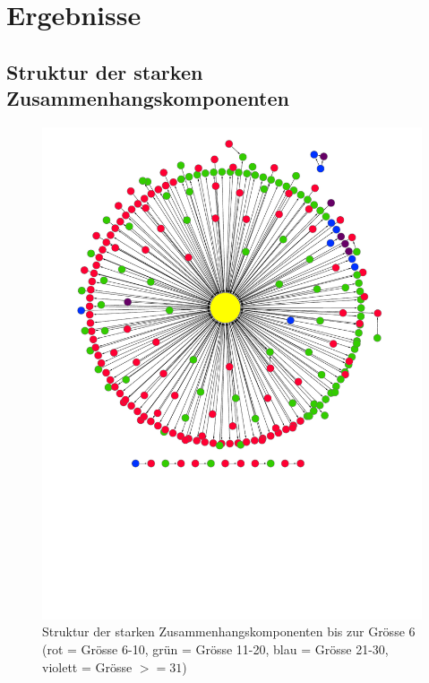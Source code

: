 
\chapter{Ergebnisse}
\label{ch:Ergebnisse}

\section{Struktur der starken Zusammenhangskomponenten}
\label{sec:struktur-der-starken}

\begin{figure}[h]
  \centering
  \includegraphics[scale=0.9]{images/metagraph-8.pdf}
  \caption{Struktur der starken Zusammenhangskomponenten bis zur
    Grösse 6 (rot = Grösse 6-10, grün = Grösse 11-20, blau = Grösse
    21-30, violett = Grösse $>= 31$)}
  \label{fig:komponenten-struktur}
\end{figure}


